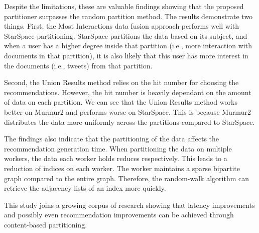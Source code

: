 Despite the limitations, these are valuable findings showing that the proposed partitioner surpasses the random partition method. The results demonstrate two things. First, the Most Interactions data fusion approach performs well with StarSpace partitioning. StarSpace partitions the data based on its subject, and when a user has a higher degree inside that partition (i.e., more interaction with documents in that partition), it is also likely that this user has more interest in the documents (i.e., tweets) from that partition. 


Second, the Union Results method relies on the hit number for choosing the recommendations. However, the hit number is heavily dependant on the amount of data on each partition. We can see that the Union Results method works better on Murmur2 and performs worse on StarSpace. This is because Murmur2 distributes the data more uniformly across the partitions compared to StarSpace.


The findings also indicate that the partitioning of the data affects the recommendation generation time. When partitioning the data on multiple workers, the data each worker holds reduces respectively. This leads to a reduction of indices on each worker. The worker maintains a sparse bipartite graph compared to the entire graph. Therefore, the random-walk algorithm can retrieve the adjacency lists of an index more quickly.


This study joins a growing corpus of research showing that latency improvements and possibly even recommendation improvements can be achieved through content-based partitioning.
